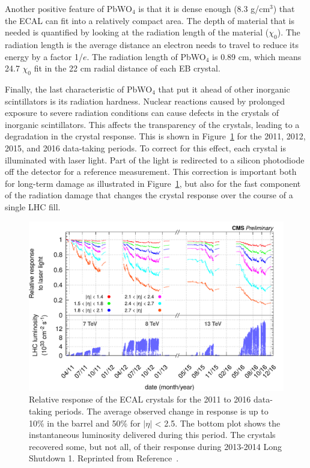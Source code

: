 Another positive feature of PbWO$_4$ is that it is dense enough (8.3 g/cm$^3$) that the ECAL can fit into a relatively compact area. The depth of material that is needed is quantified by looking at the radiation length of the material ($\chi_0$). The radiation length is the average distance an electron needs to travel to reduce its energy by a factor 1/$e$. The radiation length of PbWO$_4$ is 0.89 cm, which means 24.7 $\chi_0$ fit in the 22 cm radial distance of each EB crystal.

Finally, the last characteristic of PbWO$_4$ that put it ahead of other inorganic scintillators is its radiation hardness. Nuclear reactions caused by prolonged exposure to severe radiation conditions can cause defects in the crystals of inorganic scintillators. This affects the transparency of the crystals, leading to a degradation in the crystal response. This is shown in Figure~\ref{fig:ecal_response} for the 2011, 2012, 2015, and 2016 data-taking periods. To correct for this effect, each crystal is illuminated with laser light. Part of the light is redirected to a silicon photodiode off the detector for a reference measurement. This correction is important both for long-term damage as illustrated in Figure~\ref{fig:ecal_response}, but also for the fast component of the radiation damage that changes the crystal response over the course of a single LHC fill.

\begin{figure}[h!]
	\centering
	\includegraphics[width=\linewidth]{Figures/Detector/ecal_response.png}
       \caption{ Relative response of the ECAL crystals for the 2011 to 2016 data-taking periods.
       The average observed change in response is up to 10\% in the barrel and 50\% for $|\eta|$ < 2.5. 
       The bottom plot shows the instantaneous luminosity delivered during this period. The crystals recovered 
       some, but not all, of their response during 2013-2014 Long Shutdown 1. Reprinted from Reference~\cite{ECALDPGtwiki}.}
   	\label{fig:ecal_response}
\end{figure}



